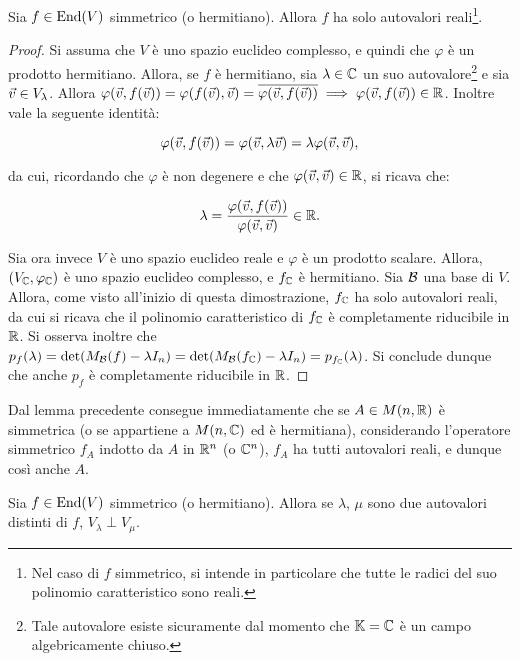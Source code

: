 \begin{lemma}
	Sia $f \in \operatorname{End}(V)$ simmetrico (o hermitiano). Allora $f$ ha solo autovalori reali\footnote{Nel caso
		di $f$ simmetrico, si intende in particolare che tutte le radici del suo polinomio caratteristico
		sono reali.}.
\end{lemma}

\begin{proof}
	Si assuma che $V$ è uno spazio euclideo complesso, e quindi che $\varphi$ è un prodotto hermitiano. Allora,
	se $f$ è hermitiano, sia $\lambda \in \mathbb C$ un suo autovalore\footnote{Tale autovalore esiste sicuramente dal momento
		che $\mathbb{K} = \mathbb C$ è un campo algebricamente chiuso.} e sia $\v \in V_\lambda$. Allora $\varphi(\v, f(\v)) =
	\varphi(f(\v), \v) = \conj{\varphi(\v, f(\v))} \implies \varphi(\v, f(\v)) \in \RR$. Inoltre vale
	la seguente identità:
	
	\[ \varphi(\v, f(\v)) = \varphi(\v, \lambda \v) = \lambda \varphi(\v, \v), \]
	
	da cui, ricordando che $\varphi$ è non degenere e che $\varphi(\v, \v) \in \RR$, si ricava che:
	
	\[ \lambda = \frac{\varphi(\v, f(\v))}{\varphi(\v, \v)} \in \RR. \]
	
	\vskip 0.05in
	
	Sia ora invece $V$ è uno spazio euclideo reale e $\varphi$ è un prodotto scalare. Allora, $(V_\mathbb C, \varphi_\mathbb C)$
	è uno spazio euclideo complesso, e $f_\mathbb C$ è hermitiano. Sia $\mathcal{B}$ una base di $V$. Allora, come visto all'inizio di questa
	dimostrazione, $f_\mathbb C$ ha solo autovalori reali, da cui si ricava che il polinomio caratteristico
	di $f_\mathbb C$ è completamente riducibile in $\mathbb R$. Si osserva inoltre che $p_f(\lambda) = \det(M_{\mathcal{B}}(f) - \lambda I_n) = \det(M_{\mathcal{B}}(f_\mathbb C) - \lambda I_n) = p_{f_\mathbb C}(\lambda)$. Si conclude dunque che
	anche $p_f$ è completamente riducibile in $\mathbb R$.
\end{proof}

\begin{remark}
	Dal lemma precedente consegue immediatamente che se $A \in M(n, \mathbb R)$ è simmetrica (o se appartiene a
	$M(n, \mathbb C)$ ed è hermitiana), considerando l'operatore simmetrico $f_A$ indotto da $A$ in $\mathbb R^n$ (o $\mathbb C^n$),
	$f_A$ ha tutti autovalori reali, e dunque così anche $A$. 
\end{remark}

\begin{lemma}
	Sia $f \in \operatorname{End}(V)$ simmetrico (o hermitiano). Allora se $\lambda$, $\mu$ sono due autovalori distinti
	di $f$, $V_\lambda \perp V_\mu$.
\end{lemma}

